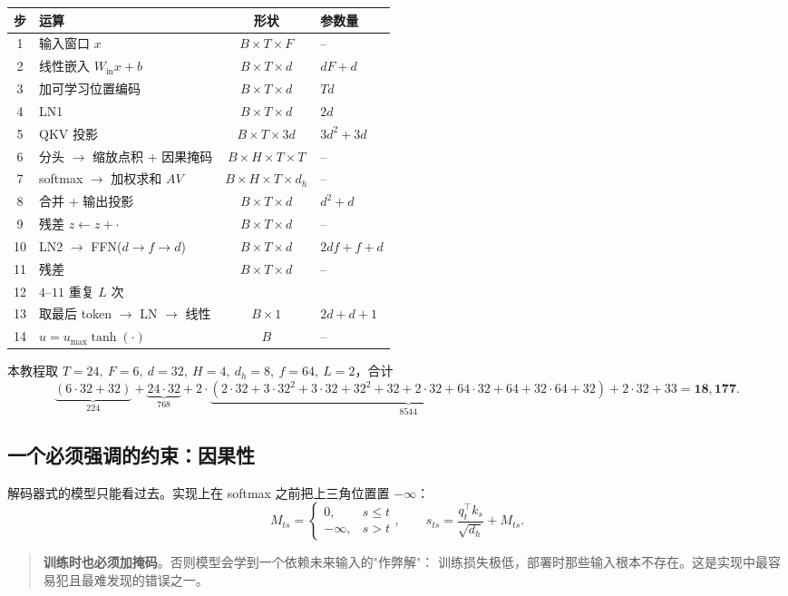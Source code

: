 \documentclass[11pt,a4paper]{ctexart}
\begin{document}
\begin{center}
\small
\begin{tabular}{@{}clcl@{}}
\toprule
步 & 运算 & 形状 & 参数量 \\
\midrule
1 & 输入窗口 $x$ & $B\times T\times F$ & -- \\
2 & 线性嵌入 $W_{\text{in}}x+b$ & $B\times T\times d$ & $dF+d$ \\
3 & 加可学习位置编码 & $B\times T\times d$ & $Td$ \\
4 & LN1 & $B\times T\times d$ & $2d$ \\
5 & QKV 投影 & $B\times T\times 3d$ & $3d^2+3d$ \\
6 & 分头 $\to$ 缩放点积 + 因果掩码 & $B\times H\times T\times T$ & -- \\
7 & softmax $\to$ 加权求和 $AV$ & $B\times H\times T\times d_h$ & -- \\
8 & 合并 + 输出投影 & $B\times T\times d$ & $d^2+d$ \\
9 & 残差 $z\leftarrow z+\cdot$ & $B\times T\times d$ & -- \\
10 & LN2 $\to$ FFN($d\to f\to d$) & $B\times T\times d$ & $2df+f+d$ \\
11 & 残差 & $B\times T\times d$ & -- \\
12 & $4$--$11$ 重复 $L$ 次 & & \\
13 & 取最后 token $\to$ LN $\to$ 线性 & $B\times 1$ & $2d+d+1$ \\
14 & $u=u_{\max}\tanh(\cdot)$ & $B$ & -- \\
\bottomrule
\end{tabular}
\end{center}

本教程取 $T=24,\ F=6,\ d=32,\ H=4,\ d_h=8,\ f=64,\ L=2$，合计
\begin{equation}
  \underbrace{(6\cdot32+32)}_{224}+\underbrace{24\cdot32}_{768}
  +2\cdot\underbrace{(2\cdot32+3\cdot32^2+3\cdot32+32^2+32+2\cdot32+64\cdot32+64+32\cdot64+32)}_{8544}
  +2\cdot32+33=\mathbf{18{,}177}.
\end{equation}

\subsection{一个必须强调的约束：因果性}

解码器式的模型只能看过去。实现上在 softmax 之前把上三角位置置 $-\infty$：
\begin{equation}
  M_{ts}=\begin{cases}0,& s\le t\\-\infty,& s>t\end{cases},\qquad
  s_{ts}=\frac{q_t^\top k_s}{\sqrt{d_h}}+M_{ts}.
\end{equation}
\begin{quote}
\textbf{训练时也必须加掩码}。否则模型会学到一个依赖未来输入的"作弊解"：
训练损失极低，部署时那些输入根本不存在。这是实现中最容易犯且最难发现的错误之一。
\end{quote}
\end{document}
